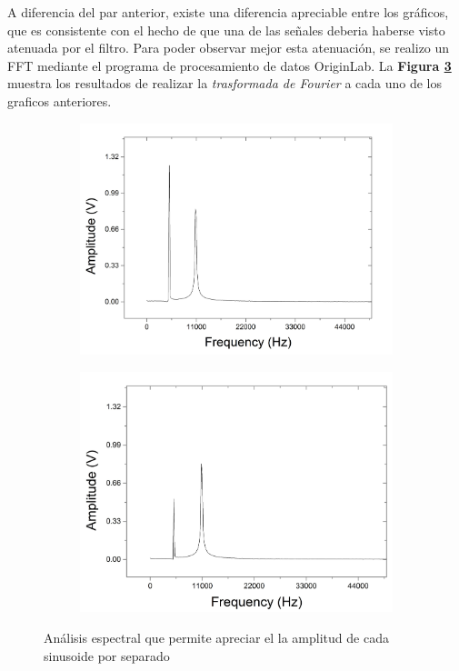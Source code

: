 \documentclass[11pt,a4paper]{article}
\begin{document}
A diferencia del par anterior, existe una diferencia apreciable entre los gráficos, que es consistente con el hecho de que una de las señales deberia haberse visto atenuada por el filtro. Para poder observar mejor esta atenuación, se realizo un FFT mediante el programa de procesamiento de datos OriginLab. La \textbf{Figura \ref{fig:FFT}} muestra los resultados de realizar la \textit{trasformada de Fourier} a cada uno de los graficos anteriores.

\begin{figure}[H]
	\begin{subfigure}{0.5\textwidth}
		\includegraphics[scale=0.3]{FFT_5005hz}
		\label{subfig:FFT_NFilt}
	\end{subfigure}
	\begin{subfigure}{0.5\textwidth}
		\includegraphics[scale=0.3]{FFT_5005hz_Filtrado}
		\label{subfig:FFT_Filt}
	\end{subfigure}
	\caption{Análisis espectral que permite apreciar el la amplitud de cada sinusoide por separado}
	\label{fig:FFT}
\end{figure}
\end{document}
